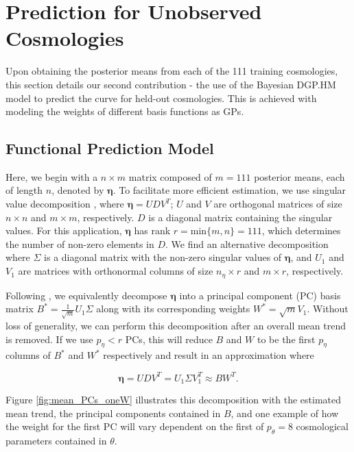 \documentclass[11pt]{article}
\begin{document}
\section{Prediction for Unobserved Cosmologies}
\label{sec:pred}

Upon obtaining the posterior means from each of the 111 training cosmologies, this 
section details our second contribution - the use of the Bayesian DGP.HM model 
to predict the curve for held-out cosmologies. This is achieved with modeling the 
weights of different basis functions as GPs.

\subsection{Functional Prediction Model}
\label{subsec:pca}

Here, we begin with a $n \times m$ matrix composed of $m=111$ posterior means, 
each of length $n$, denoted by $\boldsymbol\eta$. To facilitate more efficient estimation, 
we use singular value decomposition \citep[SVD; e.g.,][]{banerjee2014linear}, 
where $\boldsymbol\eta = UDV^T$; $U$ and $V$ are orthogonal matrices of size $n \times n$ 
and $m\times m$, respectively. $D$ is a diagonal matrix containing the singular values. 
For this application, $\boldsymbol\eta$ has rank $r=\text{min}\{m,n\}=111$, which 
determines the number of non-zero elements in $D$. We find an alternative decomposition 
where $\Sigma$ is a diagonal matrix with the non-zero singular values of $\boldsymbol\eta$, 
and $U_1$ and $V_1$ are matrices with orthonormal columns of size $n_\eta \times r$ 
and $m \times r$, respectively. 

Following \cite{higdon2008computer, higdon2010estcosmo}, we equivalently decompose 
$\boldsymbol\eta$ into a principal component (PC) basis matrix 
$B^* = \frac{1}{\sqrt{m}}U_1\Sigma$ along with its corresponding weights 
$W^* = \sqrt{m}V_1$. Without loss of generality, we can perform this decomposition 
after an overall mean trend is removed. If we use $p_\eta < r$ PCs, this will reduce 
$B$ and $W$ to be the first $p_\eta$ columns of $B^*$ and $W^*$ respectively and 
result in an approximation where 

\begin{equation}
    \boldsymbol\eta= UDV^T = U_1\Sigma V_1^T \approx BW^T.
\end{equation}

Figure \ref{fig:mean_PCs_oneW} illustrates this decomposition with the estimated 
mean trend, the principal components contained in $B$, and one example of how the 
weight for the first PC will vary dependent on the first of $p_\theta=8$ cosmological 
parameters contained in $\theta$.
\end{document}
